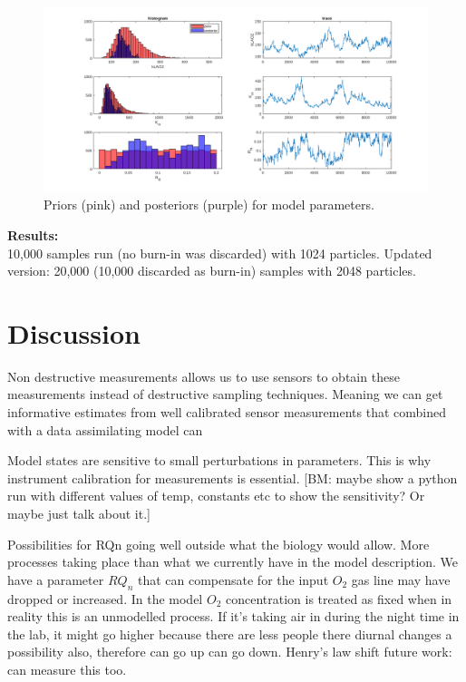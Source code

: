 \documentclass{ruthesis}
\begin{document}
\begin{figure}
	\centerline{\includegraphics[width=1.3\textwidth]{images_microalgae/plots_iterative/model_parameters}}
	\caption[.]{Priors (pink) and posteriors (purple) for model parameters.}
	\label{fig:micro_exp_iterative_parameters_model}
\end{figure}


\textbf{Results:}\\
10,000 samples run (no burn-in was discarded) with 1024 particles.
Updated version: 20,000 (10,000 discarded as burn-in) samples with 2048 particles.




\FloatBarrier
\section{Discussion}

Non destructive measurements allows us to use sensors to obtain these measurements instead of destructive sampling techniques. Meaning we can get informative estimates from well calibrated sensor measurements that combined with a data assimilating model can 



Model states are sensitive to small perturbations in parameters. This is why instrument calibration for measurements is essential. [BM: maybe show a python run with different values of temp, constants etc to show the sensitivity? Or maybe just talk about it.] 


Possibilities for RQn going well outside what the biology would allow. 
More processes taking place than what we currently have in the model description. We have a parameter $RQ_n$ that can compensate for the input $O_2$ gas line may have dropped or increased.
In the model $O_2$ concentration is treated as fixed when in reality this is an unmodelled process. If it's taking air in during the night time in the lab, it might go higher because there are less people there 
diurnal changes a possibility also, therefore can go up can go down.
Henry's law shift 
future work: can measure this too.
\end{document}
